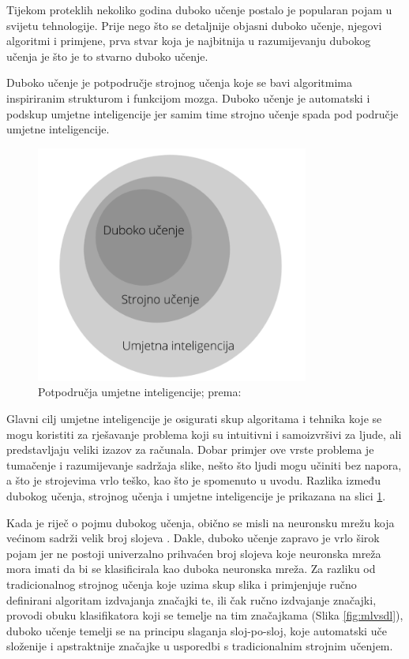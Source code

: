 \documentclass[]{foi} %
\begin{document}
Tijekom proteklih nekoliko godina duboko učenje postalo je popularan pojam u svijetu tehnologije. Prije nego što se detaljnije objasni duboko učenje, njegovi algoritmi i primjene, prva stvar koja je najbitnija u razumijevanju dubokog učenja je što je to stvarno duboko učenje.

Duboko učenje \cite{builtin1} je potpodručje strojnog učenja koje se bavi algoritmima inspiriranim strukturom i funkcijom mozga. Duboko učenje je automatski i podskup umjetne inteligencije jer samim time strojno učenje spada pod područje umjetne inteligencije.

\vspace{10mm}
\begin{figure}[!ht]
    \centering
    \includegraphics[width=0.8\textwidth]{slike/podjela.png}
    \caption{Potpodručja umjetne inteligencije; prema: \cite{builtin1}}
    \label{fig:podjela}
\end{figure}
\vspace{10mm}

Glavni cilj \cite{builtin1} umjetne inteligencije je osigurati skup algoritama i tehnika koje se mogu koristiti za rješavanje problema koji su intuitivni i samoizvršivi za ljude, ali predstavljaju veliki izazov za računala. Dobar primjer ove vrste problema je tumačenje i razumijevanje sadržaja slike, nešto što ljudi mogu učiniti bez napora, a što je strojevima vrlo teško, kao što je spomenuto u uvodu. Razlika između dubokog učenja, strojnog učenja i umjetne inteligencije je prikazana na slici \ref{fig:podjela}.

\newpage
Kada je riječ o pojmu dubokog učenja, obično se misli na neuronsku mrežu koja većinom sadrži velik broj slojeva \cite{builtin1}. Dakle, duboko učenje zapravo je vrlo širok pojam jer ne postoji univerzalno prihvaćen broj slojeva koje neuronska mreža mora imati da bi se klasificirala kao duboka neuronska mreža. Za razliku od tradicionalnog strojnog učenja koje uzima skup slika i primjenjuje ručno definirani algoritam izdvajanja značajki te, ili čak ručno izdvajanje značajki, provodi obuku klasifikatora koji se temelje na tim značajkama (Slika \ref{fig:mlvsdl}), duboko učenje temelji se na principu slaganja sloj-po-sloj, koje automatski uče složenije i apstraktnije značajke u usporedbi s tradicionalnim strojnim učenjem.
\end{document}

